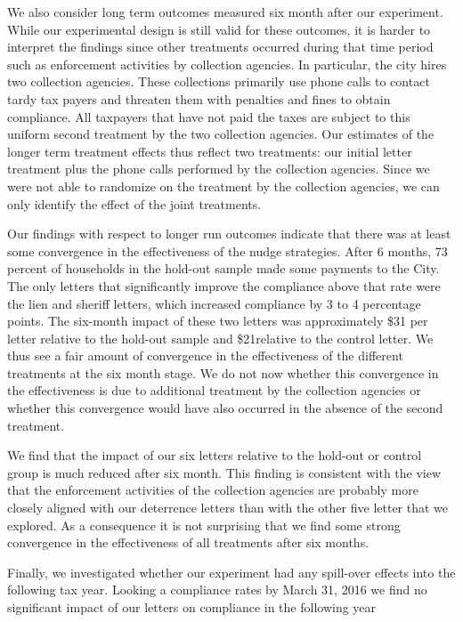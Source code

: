 \documentclass[12pt]{article}
\begin{document}
We also consider long term outcomes measured six month after our
experiment. While our experimental design is still valid for these
outcomes, it is harder to interpret the findings since other
treatments occurred during that time period such as enforcement
activities by collection agencies. In particular, the city hires two
collection agencies. These collections primarily use phone calls to
contact tardy tax payers and threaten them with penalties and fines to
obtain compliance. All taxpayers that have not paid the taxes are
subject to this uniform second treatment by the two collection
agencies.  Our estimates of the longer term treatment effects thus
reflect two treatments: our initial letter treatment plus the phone
calls performed by the collection agencies. Since we were not able to
randomize on the treatment by the collection agencies, we can only
identify the effect of the joint treatments.

Our findings with respect to longer run outcomes indicate that there
was at least some convergence in the effectiveness of the nudge
strategies. After 6 months, 73 percent of households in the hold-out
sample made some payments to the City. The only letters that
significantly improve the compliance above that rate were the lien and
sheriff letters, which increased compliance by 3 to 4 percentage
points. The six-month impact of these two letters was approximately
\$31 per letter relative to the hold-out sample and \$21relative to
the control letter. We thus see a fair amount of convergence in the
effectiveness of the different treatments at the six month stage. We
do not now whether this convergence in the effectiveness is due to
additional treatment by the collection agencies or whether this
convergence would have also occurred in the absence of the second
treatment.

We find that the impact of our six letters relative to the hold-out or
control group is much reduced after six month. This finding is
consistent with the view that the enforcement activities of the
collection agencies are probably more closely aligned with our
deterrence letters than with the other five letter that we
explored. As a consequence it is not surprising that we find some
strong convergence in the effectiveness of all treatments after six
months.

Finally, we investigated whether our experiment had any spill-over
effects into the following tax year. Looking a compliance rates by
March 31, 2016 we find no significant impact of our letters on
compliance in the following year
\end{document}
